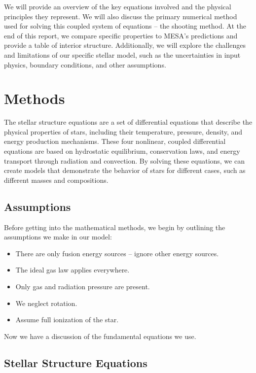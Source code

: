 \documentclass[twocolumn]{aastex631}
\begin{document}
We will provide an overview of the key equations involved and the physical principles they represent. We will also discuss the primary numerical method used for solving this coupled system of equations -- the shooting method. At the end of this report, we compare specific properties to MESA's predictions and provide a table of interior structure. Additionally, we will explore the challenges and limitations of our specific stellar model, such as the uncertainties in input physics, boundary conditions, and other assumptions.

\section{Methods} \label{sec:method}

The stellar structure equations are a set of differential equations that describe the physical properties of stars, including their temperature, pressure, density, and energy production mechanisms. These four nonlinear, coupled differential equations are based on hydrostatic equilibrium, conservation laws, and energy transport through radiation and convection. By solving these equations, we can create models that demonstrate the behavior of stars for different cases, such as different masses and compositions.

\subsection{Assumptions}

Before getting into the mathematical methods, we begin by outlining the assumptions we make in our model:

\begin{itemize}
	\item There are only fusion energy sources -- ignore other energy sources.
	\item The ideal gas law applies everywhere.
	\item Only gas and radiation pressure are present.
	\item We neglect rotation.
	\item Assume full ionization of the star.
\end{itemize}

Now we have a discussion of the fundamental equations we use.

\subsection{Stellar Structure Equations}
\end{document}
